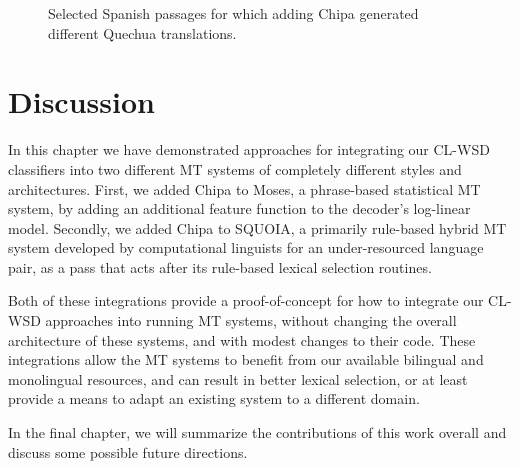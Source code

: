 \begin{figure}
\label{sent:putyourhand}

\label{sent:alreadydead}

\label{sent:burning}

\label{sent:reins}

\label{sent:llama}
  \caption{Selected Spanish passages for which adding Chipa generated different
  Quechua translations.}
  \label{fig:some-spanish-verses-with-changes}
\end{figure}

\section{Discussion}
In this chapter we have demonstrated approaches for integrating our CL-WSD
classifiers into two different MT systems of completely different styles and
architectures. First, we added Chipa to Moses, a phrase-based statistical MT
system, by adding an additional feature function to the decoder's log-linear
model.  Secondly, we added Chipa to SQUOIA, a primarily rule-based hybrid MT
system developed by computational linguists for an under-resourced language
pair, as a pass that acts after its rule-based lexical selection routines.

Both of these integrations provide a proof-of-concept for how to integrate our
CL-WSD approaches into running MT systems, without changing the overall
architecture of these systems, and with modest changes to their code. These
integrations allow the MT systems to benefit from our available bilingual and
monolingual resources, and can result in better lexical selection, or at least
provide a means to adapt an existing system to a different domain.

In the final chapter, we will summarize the contributions of this work overall
and discuss some possible future directions.
